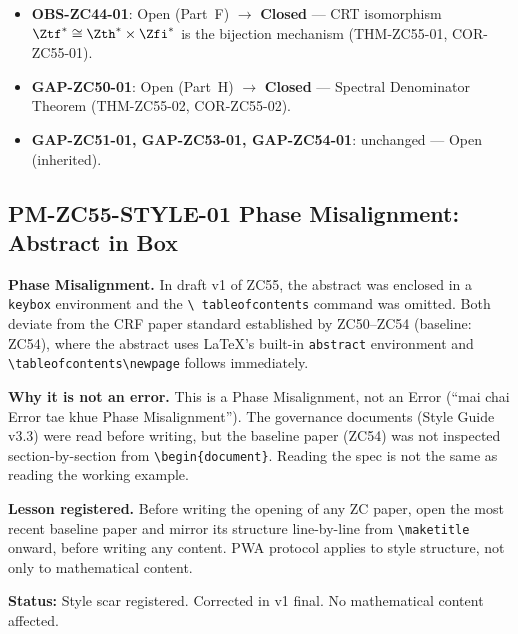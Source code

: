 \documentclass[12pt, a4paper]{article}
\begin{document}
\begin{keybox}[title={Gap Status Updates}]
\begin{itemize}[leftmargin=1.5em, noitemsep]
\item \textbf{OBS-ZC44-01}: Open (Part~F) $\to$ \textbf{Closed}
  --- CRT isomorphism $\Ztf^*\cong\Zth^*\times\Zfi^*$
  is the bijection mechanism (THM-ZC55-01, COR-ZC55-01).
\item \textbf{GAP-ZC50-01}: Open (Part~H) $\to$ \textbf{Closed}
  --- Spectral Denominator Theorem (THM-ZC55-02, COR-ZC55-02).
\item \textbf{GAP-ZC51-01, GAP-ZC53-01, GAP-ZC54-01}:
  unchanged --- Open (inherited).
\end{itemize}
\end{keybox}

\subsection{PM-ZC55-STYLE-01 \quad Phase Misalignment: Abstract in Box}


\begin{openqbox}[title={PM-ZC55-STYLE-01: Abstract placed in
  \texttt{keybox} in Draft v1 (Style Scar)}]
\textbf{Phase Misalignment.}
In draft v1 of ZC55, the abstract was enclosed in a
\texttt{keybox} environment and the \texttt{\textbackslash
tableofcontents} command was omitted.
Both deviate from the CRF paper standard established by
ZC50--ZC54 (baseline: ZC54), where the abstract uses
LaTeX's built-in \texttt{abstract} environment and
\texttt{\textbackslash tableofcontents\textbackslash newpage}
follows immediately.

\textbf{Why it is not an error.}
This is a Phase Misalignment, not an Error
(``mai chai Error tae khue Phase Misalignment'').
The governance documents (Style Guide v3.3) were read before
writing, but the baseline paper (ZC54) was not inspected
section-by-section from \texttt{\textbackslash begin\{document\}}.
Reading the spec is not the same as reading the working example.

\textbf{Lesson registered.}
Before writing the opening of any ZC paper, open the most recent
baseline paper and mirror its structure line-by-line from
\texttt{\textbackslash maketitle} onward, before writing
any content.  PWA protocol applies to style structure, not
only to mathematical content.

\textbf{Status:} Style scar registered. Corrected in v1 final.
No mathematical content affected.
\end{openqbox}
\end{document}
